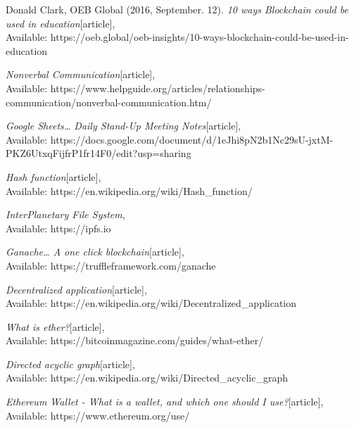 \begin{thebibliography}{20}
Donald Clark, OEB Global (2016, September. 12).
\emph{10 ways Blockchain could be used in education}[article],\\
Available: {https://oeb.global/oeb-insights/10-ways-blockchain-could-be-used-in-education}

\emph{Nonverbal Communication}[article],\\
Available: {https://www.helpguide.org/articles/relationships-communication/nonverbal-communication.htm/}

\emph{Google Sheets… Daily Stand-Up Meeting Notes}[article],\\
Available: {https://docs.google.com/document/d/1eJhi8pN2b1Nc29sU-jxtM-PKZ6UtxqFijfrP1fr14F0/edit?usp=sharing}

\emph{Hash function}[article],\\
Available: {https://en.wikipedia.org/wiki/Hash\_function/}

\emph{InterPlanetary File System},\\
Available: {https://ipfs.io}

\emph{Ganache… A one click blockchain}[article],\\
Available: {https://truffleframework.com/ganache}

\emph{Decentralized application}[article],\\
Available: {https://en.wikipedia.org/wiki/Decentralized\_application}

\emph{What is ether?}[article],\\
Available: {https://bitcoinmagazine.com/guides/what-ether/}

\emph{Directed acyclic graph}[article],\\
Available: {https://en.wikipedia.org/wiki/Directed\_acyclic\_graph}

\emph{Ethereum Wallet - What is a wallet, and which one should I use?}[article],\\
Available: {https://www.ethereum.org/use/}

\end{thebibliography}

